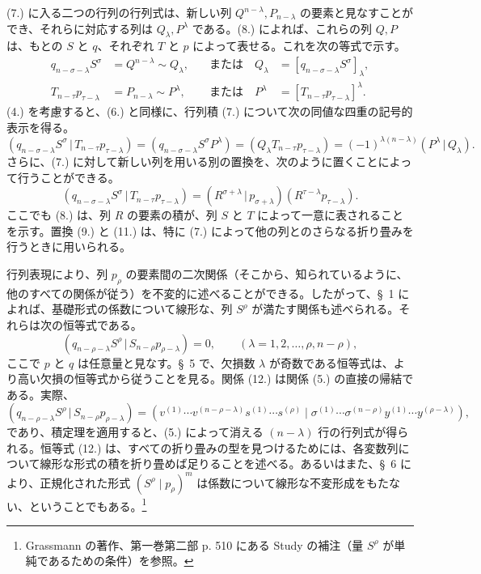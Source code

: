 \documentclass[11pt]{article}
\newcommand{\pair}[2]{(#1\,|\,#2)}
\begin{document}
(7.) に入る二つの行列の行列式は、新しい列 $Q^{n-\lambda},P_{n-\lambda}$ の要素と見なすことができ、それらに対応する列は $Q_\lambda,P^\lambda$ である。(8.) によれば、これらの列 $Q,P$ は、もとの $S$ と $q$、それぞれ $T$ と $p$ によって表せる。これを次の等式で示す。
\begin{equation}
\begin{aligned}
 q_{n-\sigma-\lambda}S^\sigma&=Q^{n-\lambda}\sim Q_\lambda, &\quad\text{または}\quad Q_\lambda&=[q_{n-\sigma-\lambda}S^\sigma]_\lambda,\\
 T_{n-\tau}p_{\tau-\lambda}&=P_{n-\lambda}\sim P^\lambda, &\quad\text{または}\quad P^\lambda&=[T_{n-\tau}p_{\tau-\lambda}]^\lambda.
\end{aligned}
\tag{9}
\end{equation}
(4.) を考慮すると、(6.) と同様に、行列積 (7.) について次の同値な四重の記号的表示を得る。
\begin{equation}
\pair{q_{n-\sigma-\lambda}S^\sigma}{T_{n-\tau}p_{\tau-\lambda}}
=(q_{n-\sigma-\lambda}S^\sigma P^\lambda)=(Q_\lambda T_{n-\tau}p_{\tau-\lambda})=(-1)^{\lambda(n-\lambda)}\pair{P^\lambda}{Q_\lambda}.
\tag{10}
\end{equation}
さらに、(7.) に対して新しい列を用いる別の置換を、次のように置くことによって行うことができる。
\begin{equation}
 \pair{q_{n-\sigma-\lambda}S^\sigma}{T_{n-\tau}p_{\tau-\lambda}}
 =\pair{R^{\sigma+\lambda}}{p_{\sigma+\lambda}}(R^{\tau-\lambda}p_{\tau-\lambda}).
\tag{11}
\end{equation}
ここでも (8.) は、列 $R$ の要素の積が、列 $S$ と $T$ によって一意に表されることを示す。置換 (9.) と (11.) は、特に (7.) によって他の列とのさらなる折り畳みを行うときに用いられる。

行列表現により、列 $p_\rho$ の要素間の二次関係（そこから、知られているように、他のすべての関係が従う）を不変的に述べることができる。したがって、\S\ 1 によれば、基礎形式の係数について線形な、列 $S^\rho$ が満たす関係も述べられる。それらは次の恒等式である。
\begin{equation}
 \pair{q_{n-\rho-\lambda}S^\rho}{S_{n-\rho}p_{\rho-\lambda}}=0,
 \qquad (\lambda=1,2,\ldots,\rho,n-\rho),
\tag{12}
\end{equation}
ここで $p$ と $q$ は任意量と見なす。\S\ 5 で、欠損数 $\lambda$ が奇数である恒等式は、より高い欠損の恒等式から従うことを見る。関係 (12.) は関係 (5.) の直接の帰結である。実際、
\[
 \pair{q_{n-\rho-\lambda}S^\rho}{S_{n-\rho}p_{\rho-\lambda}}
 =(v^{(1)}\cdots v^{(n-\rho-\lambda)}s^{(1)}\cdots s^{(\rho)}\mid \sigma^{(1)}\cdots\sigma^{(n-\rho)}y^{(1)}\cdots y^{(\rho-\lambda)}),
\]
であり、積定理を適用すると、(5.) によって消える $(n-\lambda)$ 行の行列式が得られる。恒等式 (12.) は、すべての折り畳みの型を見つけるためには、各変数列について線形な形式の積を折り畳めば足りることを述べる。あるいはまた、\S\ 6 により、正規化された形式 $(S^\rho\mid p_\rho)^m$ は係数について線形な不変形成をもたない、ということでもある。\footnote{Grassmann の著作、第一巻第二部 p. 510 にある Study の補注（量 $S^\rho$ が単純であるための条件）を参照。}
\end{document}
